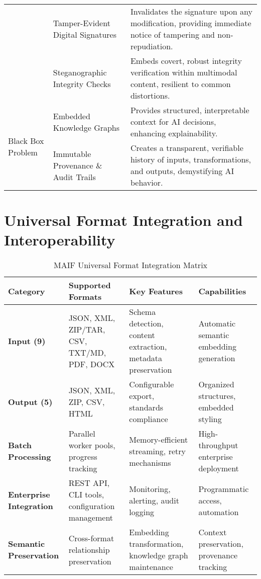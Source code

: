 \documentclass[conference]{IEEEtran}
\begin{document}
\begin{table*}[!t]
\begin{tabular}{p{3cm}p{5cm}p{5.5cm}}
& Tamper-Evident Digital Signatures\cite{ref65} & Invalidates the signature upon any modification, providing immediate notice of tampering and non-repudiation. \\
& Steganographic Integrity Checks\cite{ref73} & Embeds covert, robust integrity verification within multimodal content, resilient to common distortions. \\
\midrule
\multirow{3}{3cm}{Black Box Problem} & Embedded Knowledge Graphs\cite{ref42} & Provides structured, interpretable context for AI decisions, enhancing explainability. \\
& Immutable Provenance \& Audit Trails\cite{ref9} & Creates a transparent, verifiable history of inputs, transformations, and outputs, demystifying AI behavior. \\
\bottomrule
\end{tabular}
\end{table*}

\section{Universal Format Integration and Interoperability}

\begin{table*}[!t]
\renewcommand{\arraystretch}{1.3}
\caption{MAIF Universal Format Integration Matrix}
\label{tab:format-integration}
\centering
\footnotesize
\begin{tabular}{p{2.5cm}p{4cm}p{4cm}p{3.5cm}}
\toprule
\textbf{Category} & \textbf{Supported Formats} & \textbf{Key Features} & \textbf{Capabilities} \\
\midrule
\textbf{Input (9)} & JSON, XML, ZIP/TAR, CSV, TXT/MD, PDF, DOCX & Schema detection, content extraction, metadata preservation & Automatic semantic embedding generation \\
\textbf{Output (5)} & JSON, XML, ZIP, CSV, HTML & Configurable export, standards compliance & Organized structures, embedded styling \\
\textbf{Batch Processing} & Parallel worker pools, progress tracking & Memory-efficient streaming, retry mechanisms & High-throughput enterprise deployment \\
\textbf{Enterprise Integration} & REST API, CLI tools, configuration management & Monitoring, alerting, audit logging & Programmatic access, automation \\
\textbf{Semantic Preservation} & Cross-format relationship preservation & Embedding transformation, knowledge graph maintenance & Context preservation, provenance tracking \\
\bottomrule
\end{tabular}
\end{table*}
\end{document}
